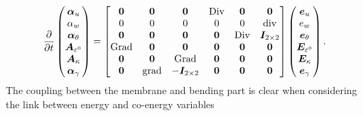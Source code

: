 \begin{equation}\label{eq:phsysLamMin}
\diffp{}{t}
\begin{pmatrix}
\bm\alpha_u \\
\alpha_w \\
\bm\alpha_\theta \\
\bm{A}_{\varepsilon^0} \\
\bm{A}_\kappa \\
\bm\alpha_{\gamma} \\
\end{pmatrix} = 
\begin{bmatrix}
\bm{0} & \bm{0} & \bm{0} &  \Div & \bm{0} & \bm{0} \\
0 & 0 & 0 & 0  & 0 & \div \\
\bm{0} & \bm{0} & \bm{0} & \bm{0} & \Div & \bm{I}_{2 \times 2}\\
\Grad & \bm{0} & \bm{0}  & \bm{0} & \bm{0} & \bm{0} \\
\bm{0} & \bm{0} & \Grad & \bm{0} & \bm{0}  & \bm{0}\\
\bm{0} & \grad & -\bm{I}_{2 \times 2} & \bm{0} & \bm{0} & \bm{0} \\
\end{bmatrix}
\begin{pmatrix}
\bm{e}_u \\
e_w \\
\bm{e}_{\theta} \\
\bm{E}_{\varepsilon^0} \\
\bm{E}_{\kappa} \\
\bm{e}_{\gamma} \\
\end{pmatrix}.
\end{equation}
The coupling between the membrane and bending part is clear when considering the link between energy and co-energy variables

